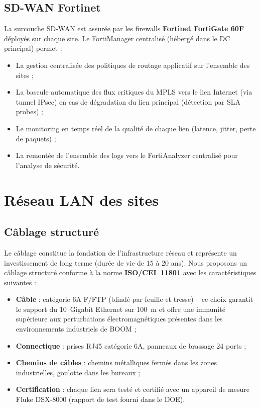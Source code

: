 \documentclass[12pt,a4paper]{report}
\begin{document}
\subsection{SD-WAN Fortinet}

La surcouche SD-WAN est assurée par les firewalls \textbf{Fortinet FortiGate 60F} déployés sur chaque site. Le FortiManager centralisé (hébergé dans le DC principal) permet :

\begin{itemize}
\item La gestion centralisée des politiques de routage applicatif sur l'ensemble des sites ;
\item La bascule automatique des flux critiques du MPLS vers le lien Internet (via tunnel IPsec) en cas de dégradation du lien principal (détection par SLA probes) ;
\item Le monitoring en temps réel de la qualité de chaque lien (latence, jitter, perte de paquets) ;
\item La remontée de l'ensemble des logs vers le FortiAnalyzer centralisé pour l'analyse de sécurité.
\end{itemize}

\section{Réseau LAN des sites}

\subsection{Câblage structuré}

Le câblage constitue la fondation de l'infrastructure réseau et représente un investissement de long terme (durée de vie de 15 à 20 ans). Nous proposons un câblage structuré conforme à la norme \textbf{ISO/CEI~11801} avec les caractéristiques suivantes :

\begin{itemize}
\item \textbf{Câble} : catégorie 6A F/FTP (blindé par feuille et tresse) -- ce choix garantit le support du 10~Gigabit Ethernet sur 100~m et offre une immunité supérieure aux perturbations électromagnétiques présentes dans les environnements industriels de BOOM ;
\item \textbf{Connectique} : prises RJ45 catégorie 6A, panneaux de brassage 24 ports ;
\item \textbf{Chemins de câbles} : chemins métalliques fermés dans les zones industrielles, goulotte dans les bureaux ;
\item \textbf{Certification} : chaque lien sera testé et certifié avec un appareil de mesure Fluke DSX-8000 (rapport de test fourni dans le DOE).
\end{itemize}
\end{document}
